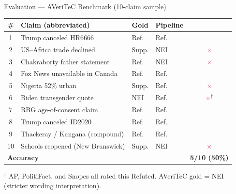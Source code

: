 \documentclass[11pt, aspectratio=169]{beamer}
\newcommand{\good}{\textcolor{forestg}{\checkmark}}
\newcommand{\bad}{\textcolor{crimson}{$\times$}}
\begin{document}
\begin{frame}{Evaluation — AVeriTeC Benchmark (10-claim sample)}
  \begin{center}
  \renewcommand{\arraystretch}{1.22}
  \begin{tabular}{clllc}
    \toprule
    \# & Claim (abbreviated) & Gold & Pipeline & \\
    \midrule
    1  & Trump canceled HR6666             & Ref.  & Ref.  & \good \\
    2  & US--Africa trade declined          & Supp. & NEI   & \bad  \\
    3  & Chakraborty father statement       & Ref.  & NEI   & \bad  \\
    4  & Fox News unavailable in Canada     & Ref.  & Ref.  & \good \\
    5  & Nigeria 52\% urban                 & Supp. & Ref.  & \bad  \\
    \midrule
    6  & Biden transgender quote            & NEI   & Ref.  & \bad$^\dagger$ \\
    7  & RBG age-of-consent claim           & Ref.  & Ref.  & \good \\
    8  & Trump canceled ID2020              & Ref.  & Ref.  & \good \\
    9  & Thackeray / Kangana (compound)     & Ref.  & Ref.  & \good \\
    10 & Schools reopened (New Brunswick)   & Supp. & NEI   & \bad  \\
    \midrule
    \multicolumn{4}{l}{\textbf{Accuracy}} & \textbf{5/10 (50\%)} \\
    \bottomrule
  \end{tabular}
  \end{center}
  {\small $^\dagger$ AP, PolitiFact, and Snopes all rated this Refuted.
  AVeriTeC gold = NEI (stricter wording interpretation).}
\end{frame}
\end{document}
